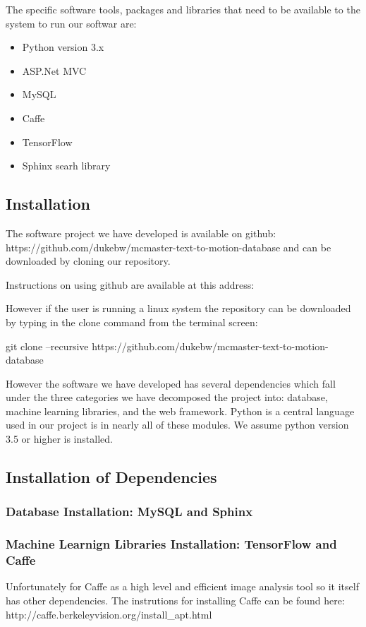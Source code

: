 \documentclass{scrreprt}
\begin{document}
The specific software tools, packages and libraries that need to be available to the system to run our softwar are:

\begin{itemize}
  \item Python version 3.x
  \item ASP.Net MVC
  \item MySQL
  \item Caffe
  \item TensorFlow
  \item Sphinx searh library
\end{itemize}


\subsection{Installation}
The software project we have developed is available on github: https://github.com/dukebw/mcmaster-text-to-motion-database and can be downloaded by cloning our repository.

Instructions on using github are available at this address:

However if the user is running a linux system the repository can be downloaded by typing in the clone command from the terminal screen:

git clone --recursive https://github.com/dukebw/mcmaster-text-to-motion-database

However the software we have developed has several dependencies which fall under the three categories we have decomposed the project into: database, machine learning libraries, and the web framework.  Python is a central language used in our project is in nearly all of these modules.  We assume python version 3.5 or higher is installed.


\subsection{Installation of Dependencies}
\subsubsection{Database Installation: MySQL and Sphinx}

\subsubsection{Machine Learnign Libraries Installation: TensorFlow and Caffe}

Unfortunately for Caffe as a high level and efficient image analysis tool so it itself has other dependencies. The instrutions for installing Caffe can be found here: http://caffe.berkeleyvision.org/install_apt.html
\end{document}
